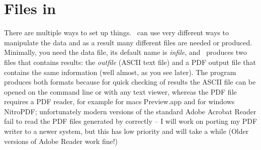 \chapter{Files in \migrate}


There are multiple ways to set up things. \migrate\ can use very different ways to manipulate the data and as a result many different files are needed or produced. Minimally, you need the data file, its default name is {\sl infile}, and \migrate\ produces two files that contains results: the \textsl{outfile} (ASCII text file) and a PDF output file that contains the same information (well almost, as you see later). The program produces both formats because for quick checking of results the ASCII file can be opened on the command line or with any text viewer, whereas the PDF file requires a PDF reader, for example for macs Preview.app and for windows NitroPDF; unfortunately modern versions of the standard Adobe Acrobat Reader fail to read the PDF files generated by \migrate correctly -- I will work on porting my PDF writer to a newer system, but this has low priority and will take a while (Older versions of Adobe Reader work fine!) 

\vskip 1cm

